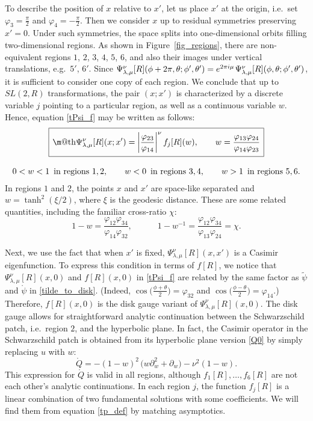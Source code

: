 \documentclass[12pt]{article}
\makeatletter
\newcommand*{\wideboxed}[1]{\setlength{\fboxsep}{1ex}%
  \fbox{\m@th$\displaystyle#1$}}
\newcommand{\vp}{\varphi}
\newcommand{\RR}{\mathbb{R}}
\DeclareMathOperator{\SL}{SL}
\newcommand{\tpsi}{\tilde{\psi}}
\newcommand{\rpsi}{\mathring{\psi}}
\newcommand{\rQ}{\mathring{Q}}
\def\ie{i.e.\ }
\def\widetilde#1{#1}%
\def\SL{SL}
\def\RR{R}
\makeatother
\begin{document}
To describe the position of $x$ relative to $x'$, let us place $x'$ at the origin, \ie set $\vp_3=\frac{\pi}{2}$ and $\vp_4=-\frac{\pi}{2}$. Then we consider $x$ up to residual symmetries preserving $x'=0$. Under such symmetries, the space splits into one-dimensional orbits filling two-dimensional regions. As shown in Figure~\ref{fig_regions}, there are non-equivalent regions $1$, $2$, $3$, $4$, $5$, $6$, and also their images under vertical translations, e.g.\ $5'$, $6'$. Since $\Psi^{\nu}_{\lambda,\mu}[R](\phi+2\pi,\theta;\phi',\theta') =e^{2\pi i\mu}\kern1pt \Psi^{\nu}_{\lambda,\mu}[R](\phi,\theta;\phi',\theta')$, it is sufficient to consider one copy of each region. We conclude that up to $\widetilde{\SL}(2,\RR)$ transformations, the pair $(x;x')$ is characterized by a discrete variable $j$ pointing to a particular region, as well as a continuous variable $w$. Hence, equation \eqref{tPsi_f} may be written as follows:
\begin{gather}
\label{tPsi_fj}
\wideboxed{
\Psi^{\nu}_{\lambda,\mu}[R](x;x')
=\left|\frac{\vp_{23}}{\vp_{14}}\right|^{\nu}f_{j}[R](w),\qquad
w=\frac{\vp_{13}\vp_{24}}{\vp_{14}\vp_{23}}
}\\[8pt]
0<w<1\, \text{ in regions }1,2,\qquad
w<0\, \text{ in regions }3,4,\qquad
w>1\, \text{ in regions }5,6.
\end{gather}
In regions $1$ and $2$, the points $x$ and $x'$ are space-like separated and $w=\tanh^2(\xi/2)$, where $\xi$ is the geodesic distance. These are some related quantities, including the familiar cross-ratio $\chi$:
\begin{equation}
1-w=\frac{\vp_{12}\vp_{34}}{\vp_{14}\vp_{32}},\qquad\quad
1-w^{-1}=\frac{\vp_{12}\vp_{34}}{\vp_{13}\vp_{24}}=\chi.
\end{equation}

Next, we use the fact that when $x'$ is fixed, $\Psi^{\nu}_{\lambda,\mu}[R](x,x')$ is a Casimir eigenfunction. To express this condition in terms of $f[R]$, we notice that $\Psi^{\nu}_{\lambda,\mu}[R](x,0)$ and $f[R](x,0)$ in \eqref{tPsi_f} are related by the same factor as $\tpsi$ and $\rpsi$ in \eqref{tilde_to_disk}. (Indeed, $\cos\bigl(\frac{\phi+\theta}{2}\bigr)=\vp_{32}$ and $\cos\bigl(\frac{\phi-\theta}{2}\bigr)=\vp_{14}$.) Therefore, $f[R](x,0)$ is the disk gauge variant of $\Psi^{\nu}_{\lambda,\mu}[R](x,0)$. The disk gauge allows for straightforward analytic continuation between the Schwarzschild patch, \ie region $2$, and the hyperbolic plane. In fact, the Casimir operator in the Schwarzschild patch  is obtained from its hyperbolic plane version \eqref{Q0} by simply replacing $u$ with $w$:
\begin{equation}
\rQ=-(1-w)^2\,\bigl(w\partial_{w}^2+\partial_{w}\bigr)-\nu^2(1-w).
\end{equation}
This expression for $\rQ$ is valid in all regions, although $f_{1}[R],\ldots,f_{6}[R]$ are not each other's analytic continuations. In each region $j$, the function $f_{j}[R]$ is a linear combination of two fundamental solutions with some coefficients. We will find them from equation \eqref{tp_def} by matching asymptotics.
\end{document}
